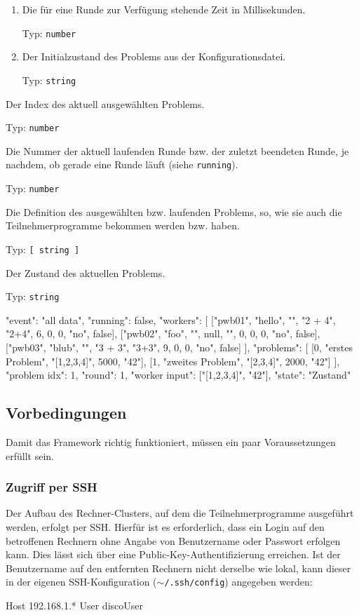 \documentclass[a4paper, 12pt]{article}
\newenvironment{example}[1]{%
  \par\description[\setlabelstyle{\normalfont}\setlabelphantom{#1}]\item[#1]%
    \verbatim%
}{%
    \endverbatim%
  \enddescription%
}
\newcommand{\type}[1]{{%
  \unskip\nobreak\hfil\penalty50%
  \hskip2pt\hbox{}\nobreak\hfil Typ: \texttt{#1}%
  \parfillskip=0pt \finalhyphendemerits=0 \par%
}}
\begin{document}
\begin{description}[\compact\breaklabel\setlabelstyle{\ttfamily}]
\begin{description}[\compact\setlabelstyle{\ttfamily}]
\begin{enumerate}
                \type{string}
          \item Die für eine Runde zur Verfügung stehende Zeit in Millisekunden.
                \type{number}
          \item Der Initialzustand des Problems aus der Konfigurationsdatei.
                \type{string}
        \end{enumerate}
      \item[problem idx]
        Der Index des aktuell ausgewählten Problems.
        \type{number}
      \item[round]
        Die Nummer der aktuell laufenden Runde bzw. der zuletzt beendeten Runde,
        je nachdem, ob gerade eine Runde läuft (siehe \verb+running+).
        \type{number}
      \item[worker input]
        Die Definition des ausgewählten bzw. laufenden Problems, so, wie sie
        auch die Teilnehmerprogramme bekommen werden bzw. haben.
        \type{[~string~]}
      \item[state]
        Der Zustand des aktuellen Problems.
        \type{string}
    \end{description}
    \begin{example}{Beispiel:}
{ "event": "all data",
  "running": false,
  "workers": [
    ["pwb01", "hello", "", "2 + 4", "2+4", 6, 0, 0, "no", false],
    ["pwb02", "foo",   "", null,    "",    0, 0, 0, "no", false],
    ["pwb03", "blub",  "", "3 + 3", "3+3", 9, 0, 0, "no", false]
  ],
  "problems": [ [0, "erstes Problem", "[1,2,3,4]", 5000, "42"],
                [1, "zweites Problem", "[2,3,4]", 2000, "42"] ],
  "problem idx": 1,
  "round": 1,
  "worker input": ["[1,2,3,4]", "42"],
  "state": "Zustand" }
    \end{example}
    \vspace{-\baselineskip}

\end{description}

\subsection{Vorbedingungen}

Damit das Framework richtig funktioniert, müssen ein paar Voraussetzungen
erfüllt sein.

\subsubsection{Zugriff per SSH}

Der Aufbau des Rechner-Clusters, auf dem die Teilnehmerprogramme ausgeführt
werden, erfolgt per SSH.
Hierfür ist es erforderlich, dass ein Login auf den betroffenen Rechnern ohne
Angabe von Benutzername oder Passwort erfolgen kann.
Dies lässt sich über eine Public-Key-Authentifizierung erreichen.
Ist der Benutzername auf den entfernten Rechnern nicht derselbe wie lokal,
kann dieser in der eigenen SSH-Konfiguration
(\texttt{\(\sim\)/.ssh/config})
angegeben werden:
\begin{example}{}
Host 192.168.1.*
     User discoUser
\end{example}
\end{document}
